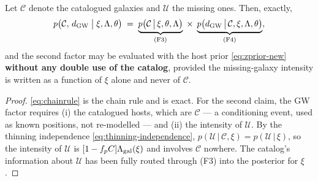 \begin{theorem}
\label{thm:double}
Let $\mathcal C$ denote the catalogued galaxies and $\mathcal U$ the missing
ones.  Then, exactly,
\begin{equation}
  p\big(\mathcal C,\,d_{\rm GW}\;\big|\;\xi,\Lambda,\theta\big)
  \;=\;
  \underbrace{p\big(\mathcal C\,\big|\,\xi,\theta,\Lambda\big)}_{\rm (F3)}
  \;\times\;
  \underbrace{p\big(d_{\rm GW}\,\big|\,\mathcal C,\xi,\Lambda,\theta\big)}_{\rm (F4)} ,
  \label{eq:chainrule}
\end{equation}
and the second factor may be evaluated with the host prior
\eqref{eq:zprior-new} \textbf{without any double use of the catalog}, provided
the missing-galaxy intensity is written as a function of $\xi$ alone and never
of $\mathcal C$.
\end{theorem}
\begin{proof}
\eqref{eq:chainrule} is the chain rule and is exact.  For the second claim, the
GW factor requires (i) the catalogued hosts, which are $\mathcal C$ --- a
conditioning event, used as known positions, not re-modelled --- and (ii) the
intensity of $\mathcal U$.  By the thinning independence
\eqref{eq:thinning-independence},
$p(\mathcal U\,|\,\mathcal C,\xi)=p(\mathcal U\,|\,\xi)$, so the intensity of
$\mathcal U$ is $[1-f_pC]\Lambda_{\rm gal}(\xi)$ and involves $\mathcal C$
nowhere.  The catalog's information about $\mathcal U$ has been fully routed
through (F3) into the posterior for $\xi$.
\end{proof}

